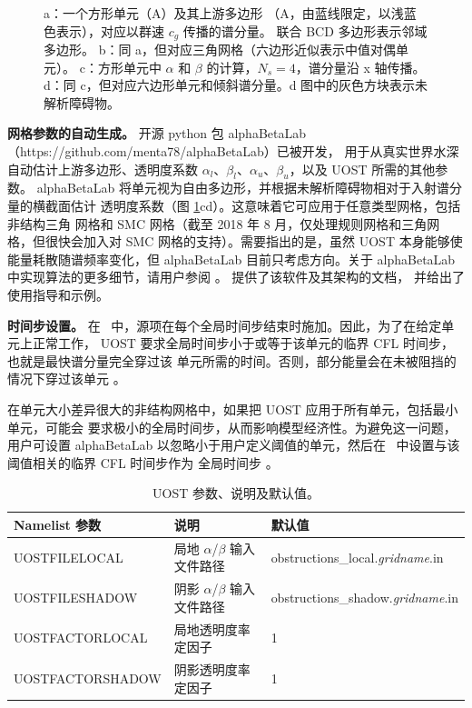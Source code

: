 \begin{figure} \begin{center}
\caption{
a：一个方形单元（A）及其上游多边形
（A\textsc{}，由蓝线限定，以浅蓝色表示），对应以群速 $c_g$ 传播的谱分量。
联合 BCD 多边形表示邻域多边形。
b：同 a，但对应三角网格（六边形近似表示中值对偶单元）。
c：方形单元中 $\alpha$ 和 $\beta$ 的计算，$N_s=4$，谱分量沿 x 轴传播。
d：同 c，但对应六边形单元和倾斜谱分量。d 图中的灰色方块表示未解析障碍物。
}
\label{fig:UOST} \botline
\end{center}
\end{figure}

\textbf{网格参数的自动生成。}
开源 python 包 alphaBetaLab（https://github.com/menta78/alphaBetaLab）已被开发，
用于从真实世界水深自动估计上游多边形、透明度系数
$\alpha_l$、$\beta_l$、$\alpha_u$、$\beta_u$，以及 UOST 所需的其他参数。
alphaBetaLab 将单元视为自由多边形，并根据未解析障碍物相对于入射谱分量的横截面估计
透明度系数（图 \ref{fig:UOST}cd）。这意味着它可应用于任意类型网格，包括非结构三角
网格和 SMC 网格（截至 2018 年 8 月，仅处理规则网格和三角网格，但很快会加入对
SMC 网格的支持）。需要指出的是，虽然 UOST 本身能够使能量耗散随谱频率变化，但
alphaBetaLab 目前只考虑方向。关于 alphaBetaLab 中实现算法的更多细节，请用户参阅
\cite{art:Mentaschi2018a}。\cite{art:Mentaschi2018c} 提供了该软件及其架构的文档，
并给出了使用指导和示例。

\textbf{时间步设置。}
在 \ws\ 中，源项在每个全局时间步结束时施加。因此，为了在给定单元上正常工作，
UOST 要求全局时间步小于或等于该单元的临界 CFL 时间步，也就是最快谱分量完全穿过该
单元所需的时间。否则，部分能量会在未被阻挡的情况下穿过该单元 \citep{art:Mentaschi2018a}。

在单元大小差异很大的非结构网格中，如果把 UOST 应用于所有单元，包括最小单元，可能会
要求极小的全局时间步，从而影响模型经济性。为避免这一问题，用户可设置 alphaBetaLab
以忽略小于用户定义阈值的单元，然后在 \ws\ 中设置与该阈值相关的临界 CFL 时间步作为
全局时间步 \citep{art:Mentaschi2018c}。

\begin{table} \begin{center}
 \footnotesize
\begin{tabular}{|p{4cm}|p{2.5cm}|p{5.5cm}|} \hline \hline
Namelist 参数    &  说明           & 默认值 \\
\hline
  UOSTFILELOCAL &  局地 $\alpha$/$\beta$ 输入文件路径   &  obstructions\_local.\textit{gridname}.in    \\ \hline
  UOSTFILESHADOW &  阴影 $\alpha$/$\beta$ 输入文件路径   & obstructions\_shadow.\textit{gridname}.in   \\ \hline
  UOSTFACTORLOCAL &  局地透明度率定因子  &  1   \\ \hline
  UOSTFACTORSHADOW &  阴影透明度率定因子  &  1  \\
\hline
\end{tabular} \end{center}
\caption{UOST 参数、说明及默认值。} \label{tab:UOST}
\botline
\end{table}
